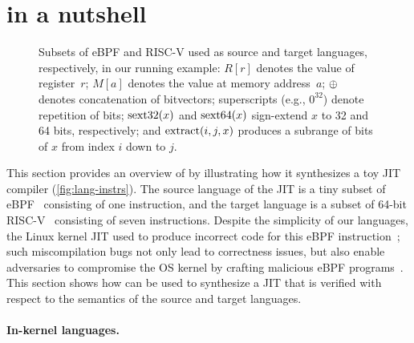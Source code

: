 \section{\jitsynth in a nutshell}%
\label{jitsynth:s:overview}

\begin{figure}[h]
  \centering
  \resizebox{\linewidth}{!}{
    
  }
  \vspace{-.5em}
  \caption{Subsets of eBPF and RISC-V
used as source and target languages, respectively,
in our running example:
$R[r]$ denotes the value of register~$r$;
$M[a]$ denotes the value at memory address~$a$;
$\oplus$ denotes concatenation of bitvectors;
superscripts (e.g., $0^{32}$) denote repetition of bits;
$\operatorname{sext32}(x)$ and $\operatorname{sext64}(x)$ sign-extend $x$ to 32 and 64 bits, respectively;
and $\operatorname{extract}(i, j, x)$ produces a subrange of bits of $x$ from index $i$ down to $j$.}
\label{fig:lang-instrs}
\end{figure}

This section provides an overview of \jitsynth by illustrating how it
synthesizes a toy JIT compiler (\autoref{fig:lang-instrs}). The source language
of the JIT is a tiny subset of eBPF~\cite{fleming:ebpf} consisting of one
instruction, and the target language is a subset of 64-bit
RISC-V~\cite{riscv:isa} consisting of seven instructions. Despite the simplicity
of our languages, the Linux kernel JIT used to produce incorrect code for this
eBPF instruction~\cite{nelson:bpf-riscv-add32-bug}; such miscompilation bugs not
only lead to correctness issues, but also enable adversaries to compromise the
OS kernel by crafting malicious eBPF programs~\cite{wang:jitk}. This section
shows how \jitsynth can be used to synthesize a JIT that is verified with
respect to the semantics of the source and target languages.\tighten

\paragraph{In-kernel languages.} 

